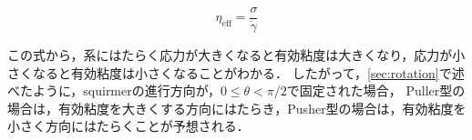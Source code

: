     \begin{equation}
        \eta_\mathrm{eff} = \frac{\sigma}{\dot{\gamma}}
    \end{equation}

\noindent
この式から，系にはたらく応力が大きくなると有効粘度は大きくなり，応力が小さくなると有効粘度は小さくなることがわかる．
したがって，\ref{sec:rotation}で述べたように，squirmerの進行方向が，$0 \leq \theta < \pi /2$で固定された場合，
Puller型の場合は，有効粘度を大きくする方向にはたらき，Pusher型の場合は，有効粘度を小さく方向にはたらくことが予想される．
